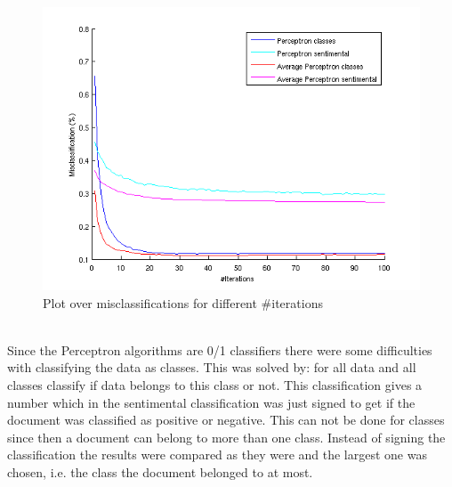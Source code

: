\begin{figure}[h!]
\centering
\includegraphics[scale = 0.4]{../Plottar/perceptron_2000words_unigram_10foldcv_classes-high_sentimental-low.png}
\caption{Plot over misclassifications for different \#iterations}
\label{fig:number_iterations}
\end{figure}\\
Since the Perceptron algorithms are 0/1 classifiers there were some difficulties with classifying the data as classes. This was solved by: for all data and all classes classify if data belongs to this class or not. This classification gives a number which in the sentimental classification was just signed to get if the document was classified as positive or negative. This can not be done for classes since then a document can belong to more than one class. Instead of signing the classification the results were compared as they were and the largest one was chosen, i.e. the class the document belonged to at most. 
